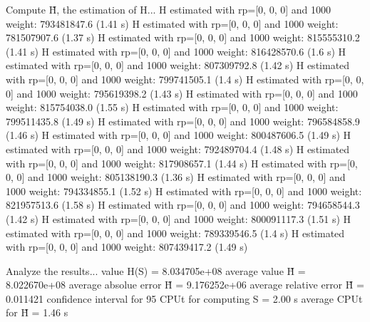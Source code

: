 Compute H̃, the estimation of H...
  H estimated with rp=[0, 0, 0] and 1000 weight:  793481847.6  (1.41 s)
  H estimated with rp=[0, 0, 0] and 1000 weight:  781507907.6  (1.37 s)
  H estimated with rp=[0, 0, 0] and 1000 weight:  815555310.2  (1.41 s)
  H estimated with rp=[0, 0, 0] and 1000 weight:  816428570.6  (1.6 s)
  H estimated with rp=[0, 0, 0] and 1000 weight:  807309792.8  (1.42 s)
  H estimated with rp=[0, 0, 0] and 1000 weight:  799741505.1  (1.4 s)
  H estimated with rp=[0, 0, 0] and 1000 weight:  795619398.2  (1.43 s)
  H estimated with rp=[0, 0, 0] and 1000 weight:  815754038.0  (1.55 s)
  H estimated with rp=[0, 0, 0] and 1000 weight:  799511435.8  (1.49 s)
  H estimated with rp=[0, 0, 0] and 1000 weight:  796584858.9  (1.46 s)
  H estimated with rp=[0, 0, 0] and 1000 weight:  800487606.5  (1.49 s)
  H estimated with rp=[0, 0, 0] and 1000 weight:  792489704.4  (1.48 s)
  H estimated with rp=[0, 0, 0] and 1000 weight:  817908657.1  (1.44 s)
  H estimated with rp=[0, 0, 0] and 1000 weight:  805138190.3  (1.36 s)
  H estimated with rp=[0, 0, 0] and 1000 weight:  794334855.1  (1.52 s)
  H estimated with rp=[0, 0, 0] and 1000 weight:  821957513.6  (1.58 s)
  H estimated with rp=[0, 0, 0] and 1000 weight:  794658544.3  (1.42 s)
  H estimated with rp=[0, 0, 0] and 1000 weight:  800091117.3  (1.51 s)
  H estimated with rp=[0, 0, 0] and 1000 weight:  789339546.5  (1.4 s)
  H estimated with rp=[0, 0, 0] and 1000 weight:  807439417.2  (1.49 s)

Analyze the results...
  value H(S)                  = 8.034705e+08 
  average value H̃             = 8.022670e+08 
  average absolue error H̃     = 9.176252e+06 
  average relative error H̃    = 0.011421 
  confidence interval for 95%
  CPUt for computing S         = 2.00 s
  average CPUt for H̃           = 1.46 s

